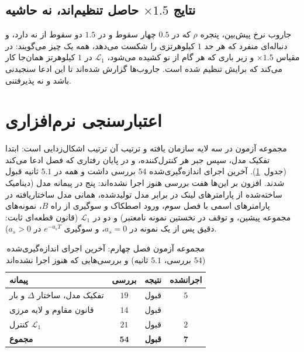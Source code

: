 \documentclass[10pt,twocolumn]{article}
\newcommand{\nd}{\lr{\textendash}}
\begin{document}
\subsection{نتایج $\times1.5$ حاصل تنظیم‌اند، نه حاشیه}
جاروب نرخ پیش‌بین، پنجره $\rho$ که در $0.5$ چهار سقوط و در $1.5$ دو سقوط از نه دارد،
و دنباله‌ای منفرد که هر حد $1$ کیلوهرتزی را شکست می‌دهد، همه یک چیز می‌گویند:
در مقیاس $\times1.5$ و زیر باری که هر گام از نو کشیده می‌شود، $\mathcal{L}_1$ در
$1$ کیلوهرتز همان‌جا کار می‌کند که برایش تنظیم شده است. جاروب‌ها گزارش شده‌اند تا این
ادعا سنجیدنی باشد و نه پذیرفتنی.

\section{اعتبارسنجی نرم‌افزاری}
مجموعه آزمون در سه لایه سازمان یافته و ترتیب آن ترتیب اشکال‌زدایی است: ابتدا تفکیک
مدل، سپس جبر هر کنترل‌کننده، و در پایان رفتاری که فصل ادعا می‌کند
(جدول~\ref{tab:tests}). آخرین اجرای اندازه‌گیری‌شده $54$ بررسی داشت و همه در $5.1$ ثانیه قبول
شدند. افزون بر این‌ها هفت بررسی هنوز اجرا نشده‌اند: پنج در پیمانه مدل (دینامیک ساخته‌شده از
پارامترهای لینک در برابر مدل تولیدشده، همانی مدل ساختاریافته در پارامترهای اسمی با فصل سوم،
ورود اصطکاک و سوگیری از راه $B$، نمونه‌های مجموعه پیشین، و توقف در نخستین نمونه نامعتبر) و
دو در $\mathcal{L}_1$ (قانون قطعه‌ای ثابت: دقیق پس از یک نمونه در $a_s=0$، و سوگیری
$e^{-a_sT}$ در $a_s>0$).

\begin{table}[H]
    \centering
    \caption{مجموعه آزمون فصل چهارم: آخرین اجرای اندازه‌گیری‌شده ($54$ بررسی، $5.1$ ثانیه)
    و بررسی‌هایی که هنوز اجرا نشده‌اند}
    \label{tab:tests}
    \small
    \begin{tabular}{lccc}
        \toprule
        پیمانه & بررسی & نتیجه & اجرانشده \\
        \midrule
        تفکیک مدل، ساختار $\Delta$ و بار & $19$ & قبول & $5$ \\
        قانون مقاوم و لایه مرزی & $14$ & قبول & \nd{} \\
        کنترل $\mathcal{L}_1$ & $21$ & قبول & $2$ \\
        \midrule
        \textbf{مجموع} & $\mathbf{54}$ & \textbf{قبول} & $\mathbf{7}$ \\
        \bottomrule
    \end{tabular}
\end{table}
\end{document}
